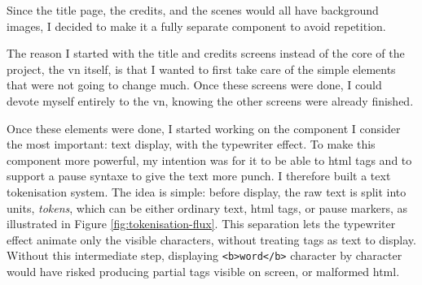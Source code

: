 Since the title page, the credits, and the scenes would all have background images, I decided to make it a fully separate component to avoid repetition.

The reason I started with the title and credits screens instead of the core of the project, the \gls{vn} itself, is that I wanted to first take care of the simple elements that were not going to change much. Once these screens were done, I could devote myself entirely to the \gls{vn}, knowing the other screens were already finished.

Once these elements were done, I started working on the component I consider the most important: text display, with the typewriter effect. To make this component more powerful, my intention was for it to be able to  \acrshort{html} tags and to support a pause \gls{syntaxe} to give the text more punch. I therefore built a text \gls{tokenisation} system. The idea is simple: before display, the raw text is split into units, \textit{tokens}, which can be either ordinary text, \acrshort{html} tags, or pause markers, as illustrated in Figure \ref{fig:tokenisation-flux}. This separation lets the typewriter effect animate only the visible characters, without treating tags as text to display. Without this intermediate step, displaying \texttt{<b>word</b>} character by character would have risked producing partial tags visible on screen, or malformed \acrshort{html}.

